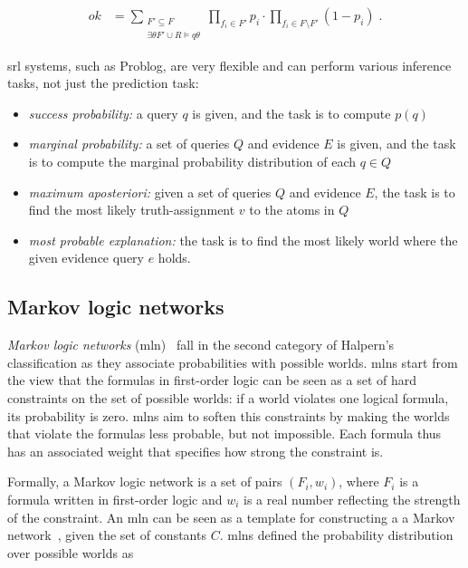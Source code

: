 $$
\begin{aligned}ok
&= \sum \limits _{\begin{array}{c} F'\subseteq F \\ \exists \theta F'\cup R\models q\theta \end{array}} \prod _{f_i\in F'}p_i\cdot \prod _{f_i\in F\setminus F'}(1-p_i)\;.
\end{aligned}
$$


\gls{srl} systems, such as Problog, are very flexible and can perform various inference tasks, not just the prediction task:
\begin{itemize}
	\item \textit{success probability:} a query $q$ is given, and the task is to compute $p(q)$
	\item \textit{marginal probability:} a set of queries $Q$ and evidence $E$ is given, and the task is to compute the marginal probability distribution of each $q \in Q$
	\item \textit{maximum aposteriori:} given a set of queries $Q$ and evidence $E$, the task is to find the most likely truth-assignment $v$ to the atoms in $Q$
	\item \textit{most probable explanation:} the task is to find the most likely world where the given evidence query $e$ holds.
\end{itemize}



\subsection{Markov logic networks}

\textit{Markov logic networks} (\gls{mln})~\cite{Richardson2006} fall in the second category of Halpern's classification as they associate probabilities with possible worlds.
\gls{mln}s start from the view that the formulas in first-order logic can be seen as a set of hard constraints on the set of possible worlds: if a world violates one logical formula, its probability is zero.
\gls{mln}s aim to soften this constraints by making the worlds that violate the formulas less probable, but not impossible.
Each formula thus has an associated weight that specifies how strong the constraint is.


Formally, a Markov logic network is a set of pairs $(F_i,w_i)$, where $F_i$ is a formula written in first-order logic and $w_i$ is a real number reflecting the strength of the constraint.
An \gls{mln} can be seen as a template for constructing a a Markov network~\cite{koller2009probabilistic}, given the set of constants $C$.
\gls{mln}s defined the probability distribution over possible worlds as

